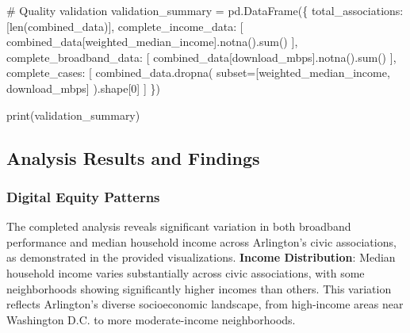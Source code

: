 \documentclass[
  letterpaper,
  DIV=11,
  numbers=noendperiod]{scrartcl}
\newenvironment{Shaded}{\begin{snugshade}}{\end{snugshade}}
\newcommand{\BuiltInTok}[1]{\textcolor[rgb]{0.00,0.23,0.31}{#1}}
\newcommand{\CommentTok}[1]{\textcolor[rgb]{0.37,0.37,0.37}{#1}}
\newcommand{\DecValTok}[1]{\textcolor[rgb]{0.68,0.00,0.00}{#1}}
\newcommand{\NormalTok}[1]{\textcolor[rgb]{0.00,0.23,0.31}{#1}}
\newcommand{\OperatorTok}[1]{\textcolor[rgb]{0.37,0.37,0.37}{#1}}
\newcommand{\StringTok}[1]{\textcolor[rgb]{0.13,0.47,0.30}{#1}}
\begin{document}
\begin{Shaded}
\begin{Highlighting}[]
\CommentTok{\# Quality validation}
\NormalTok{validation\_summary }\OperatorTok{=}\NormalTok{ pd.DataFrame(\{}
    \StringTok{\textquotesingle{}total\_associations\textquotesingle{}}\NormalTok{: [}\BuiltInTok{len}\NormalTok{(combined\_data)],}
    \StringTok{\textquotesingle{}complete\_income\_data\textquotesingle{}}\NormalTok{: [}
\NormalTok{        combined\_data[}\StringTok{\textquotesingle{}weighted\_median\_income\textquotesingle{}}\NormalTok{].notna().}\BuiltInTok{sum}\NormalTok{()}
\NormalTok{    ],}
    \StringTok{\textquotesingle{}complete\_broadband\_data\textquotesingle{}}\NormalTok{: [}
\NormalTok{        combined\_data[}\StringTok{\textquotesingle{}download\_mbps\textquotesingle{}}\NormalTok{].notna().}\BuiltInTok{sum}\NormalTok{()}
\NormalTok{    ],}
    \StringTok{\textquotesingle{}complete\_cases\textquotesingle{}}\NormalTok{: [}
\NormalTok{        combined\_data.dropna(}
\NormalTok{            subset}\OperatorTok{=}\NormalTok{[}\StringTok{\textquotesingle{}weighted\_median\_income\textquotesingle{}}\NormalTok{, }\StringTok{\textquotesingle{}download\_mbps\textquotesingle{}}\NormalTok{]}
\NormalTok{        ).shape[}\DecValTok{0}\NormalTok{]}
\NormalTok{    ]}
\NormalTok{\})}

\BuiltInTok{print}\NormalTok{(validation\_summary)}
\end{Highlighting}
\end{Shaded}

\subsection{Analysis Results and
Findings}\label{analysis-results-and-findings}

\subsubsection{Digital Equity Patterns}\label{digital-equity-patterns}

The completed analysis reveals significant variation in both broadband
performance and median household income across Arlington's civic
associations, as demonstrated in the provided visualizations.
\textbf{Income Distribution}: Median household income varies
substantially across civic associations, with some neighborhoods showing
significantly higher incomes than others. This variation reflects
Arlington's diverse socioeconomic landscape, from high-income areas near
Washington D.C. to more moderate-income neighborhoods.
\end{document}
